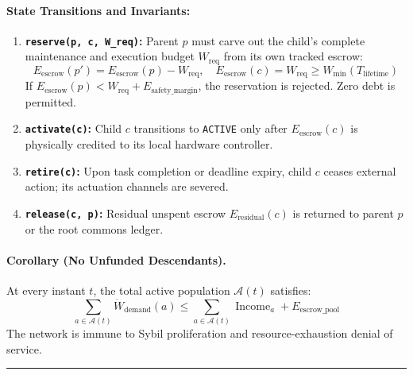 \documentclass[
]{article}
\providecommand{\tightlist}{%
  \setlength{\itemsep}{0pt}\setlength{\parskip}{0pt}}
\begin{document}
\paragraph{State Transitions and
Invariants:}\label{state-transitions-and-invariants}

\begin{enumerate}
\def\labelenumi{\arabic{enumi}.}
\tightlist
\item
  \textbf{\texttt{r\allowbreak{}e\allowbreak{}s\allowbreak{}e\allowbreak{}r\allowbreak{}v\allowbreak{}e\allowbreak{}(\allowbreak{}p\allowbreak{},\allowbreak{} \allowbreak{}c\allowbreak{},\allowbreak{} \allowbreak{}W\allowbreak{}\_\allowbreak{}r\allowbreak{}e\allowbreak{}q\allowbreak{})}:}
  Parent \(p\) must carve out the child's complete maintenance and
  execution budget \(W_{\mathrm{req}}\) from its own tracked escrow:
  \[E_{\mathrm{escrow}}(p') = E_{\mathrm{escrow}}(p) - W_{\mathrm{req}}, \quad E_{\mathrm{escrow}}(c) = W_{\mathrm{req}} \ge W_{\mathrm{min}}(T_{\mathrm{lifetime}})\]
  If
  \(E_{\mathrm{escrow}}(p) < W_{\mathrm{req}} + E_{\mathrm{safety\_margin}}\),
  the reservation is rejected. Zero debt is permitted.
\item
  \textbf{\texttt{activate(c)}:} Child \(c\) transitions to
  \texttt{ACTIVE} only after \(E_{\mathrm{escrow}}(c)\) is physically
  credited to its local hardware controller.
\item
  \textbf{\texttt{retire(c)}:} Upon task completion or deadline expiry,
  child \(c\) ceases external action; its actuation channels are
  severed.
\item
  \textbf{\texttt{release(c,\ p)}:} Residual unspent escrow
  \(E_{\mathrm{residual}}(c)\) is returned to parent \(p\) or the root
  commons ledger.
\end{enumerate}

\paragraph{Corollary (No Unfunded
Descendants).}\label{corollary-no-unfunded-descendants.}

At every instant \(t\), the total active population \(\mathcal{A}(t)\)
satisfies:
\[\sum_{a \in \mathcal{A}(t)} \dot W_{\mathrm{demand}}(a) \le \sum_{a \in \mathcal{A}(t)} \operatorname{Income}_a + E_{\mathrm{escrow\_pool}}\]
The network is immune to Sybil proliferation and resource-exhaustion
denial of service.

\begin{center}\rule{0.5\linewidth}{0.5pt}\end{center}
\end{document}
